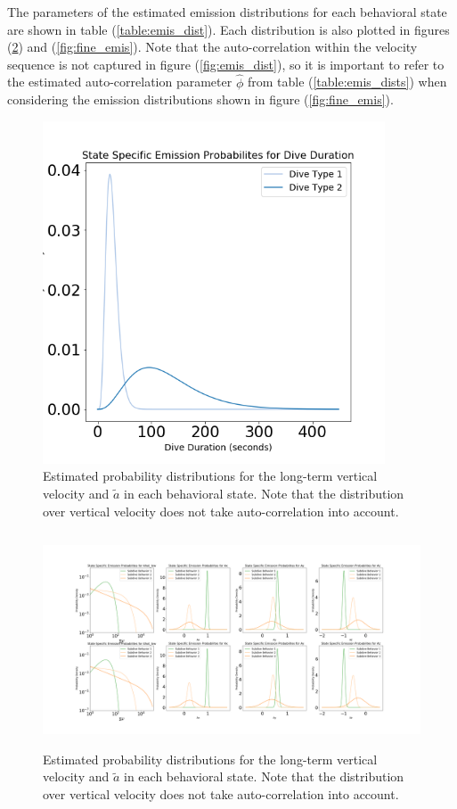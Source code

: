 The parameters of the estimated emission distributions for each behavioral state are shown in table (\ref{table:emis_dist}). Each distribution is also plotted in figures (\ref{fig:coarse_emis}) and (\ref{fig:fine_emis}). Note that the auto-correlation within the velocity sequence is not captured in figure (\ref{fig:emis_dist}), so it is important to refer to the estimated auto-correlation parameter $\hat \phi$ from table (\ref{table:emis_dists}) when considering the emission distributions shown in figure (\ref{fig:fine_emis}).
%
\begin{figure}[h!]
	\centering
	\includegraphics[height=4in]{../Plots/coarse-emissions.png}
	\caption{Estimated probability distributions for the long-term vertical velocity and $\tilde a$ in each behavioral state. Note that the distribution over vertical velocity does not take auto-correlation into account.}
	\label{fig:coarse_emis}
\end{figure}
%
\begin{figure}[h!]
	\centering
	\includegraphics[height=2.5in]{../Plots/fine-emissions.png}
	\caption{Estimated probability distributions for the long-term vertical velocity and $\tilde a$ in each behavioral state. Note that the distribution over vertical velocity does not take auto-correlation into account.}
	\label{fig:coarse_emis}
\end{figure}
